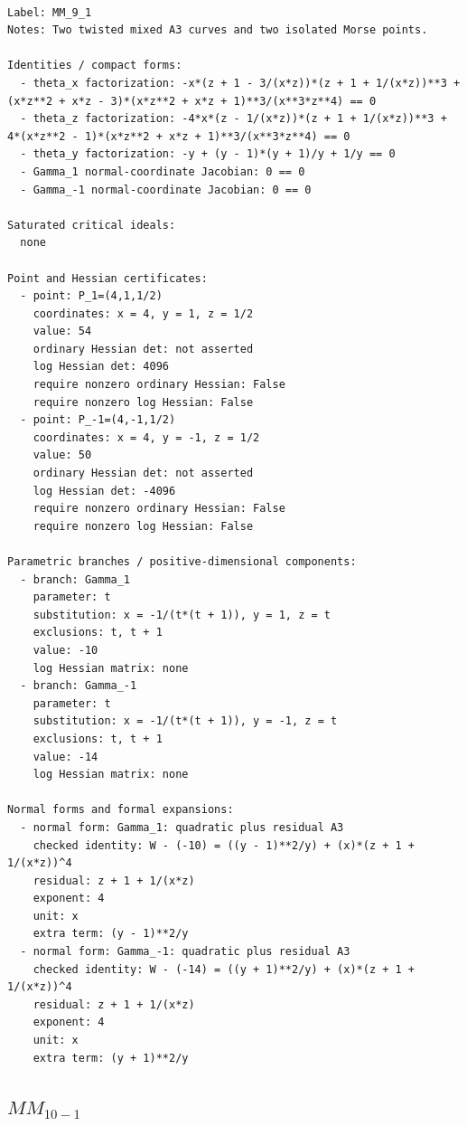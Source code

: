 \documentclass[10pt,a4paper]{article}
\begin{document}
\begin{lstlisting}

Label: MM_9_1
Notes: Two twisted mixed A3 curves and two isolated Morse points.

Identities / compact forms:
  - theta_x factorization: -x*(z + 1 - 3/(x*z))*(z + 1 + 1/(x*z))**3 + (x*z**2 + x*z - 3)*(x*z**2 + x*z + 1)**3/(x**3*z**4) == 0
  - theta_z factorization: -4*x*(z - 1/(x*z))*(z + 1 + 1/(x*z))**3 + 4*(x*z**2 - 1)*(x*z**2 + x*z + 1)**3/(x**3*z**4) == 0
  - theta_y factorization: -y + (y - 1)*(y + 1)/y + 1/y == 0
  - Gamma_1 normal-coordinate Jacobian: 0 == 0
  - Gamma_-1 normal-coordinate Jacobian: 0 == 0

Saturated critical ideals:
  none

Point and Hessian certificates:
  - point: P_1=(4,1,1/2)
    coordinates: x = 4, y = 1, z = 1/2
    value: 54
    ordinary Hessian det: not asserted
    log Hessian det: 4096
    require nonzero ordinary Hessian: False
    require nonzero log Hessian: False
  - point: P_-1=(4,-1,1/2)
    coordinates: x = 4, y = -1, z = 1/2
    value: 50
    ordinary Hessian det: not asserted
    log Hessian det: -4096
    require nonzero ordinary Hessian: False
    require nonzero log Hessian: False

Parametric branches / positive-dimensional components:
  - branch: Gamma_1
    parameter: t
    substitution: x = -1/(t*(t + 1)), y = 1, z = t
    exclusions: t, t + 1
    value: -10
    log Hessian matrix: none
  - branch: Gamma_-1
    parameter: t
    substitution: x = -1/(t*(t + 1)), y = -1, z = t
    exclusions: t, t + 1
    value: -14
    log Hessian matrix: none

Normal forms and formal expansions:
  - normal form: Gamma_1: quadratic plus residual A3
    checked identity: W - (-10) = ((y - 1)**2/y) + (x)*(z + 1 + 1/(x*z))^4
    residual: z + 1 + 1/(x*z)
    exponent: 4
    unit: x
    extra term: (y - 1)**2/y
  - normal form: Gamma_-1: quadratic plus residual A3
    checked identity: W - (-14) = ((y + 1)**2/y) + (x)*(z + 1 + 1/(x*z))^4
    residual: z + 1 + 1/(x*z)
    exponent: 4
    unit: x
    extra term: (y + 1)**2/y

\end{lstlisting}

\subsection*{$ MM_{10-1} $}
\end{document}
